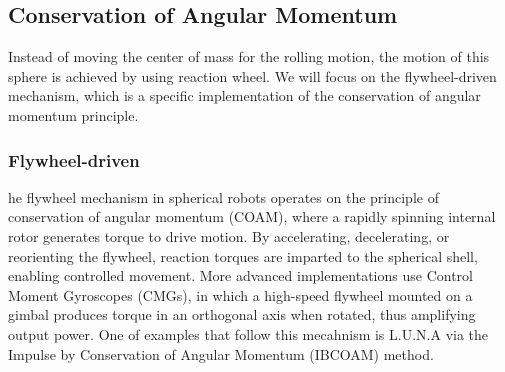 \documentclass[english, bachelor, utf8]{base/thesis_telematics}
\begin{document}
\subsection{Conservation of Angular Momentum}
Instead of moving the center of mass for the rolling motion, the motion of this sphere is achieved by using reaction wheel. 
We will focus on the flywheel-driven mechanism, which is a specific implementation of the conservation of angular momentum principle.\cite{Aminata}
\subsubsection{Flywheel-driven}
he flywheel mechanism in spherical robots operates on the principle of conservation of angular momentum (COAM), where a rapidly spinning internal rotor generates torque to drive motion. By accelerating, decelerating, or reorienting the flywheel, reaction torques are imparted to the spherical shell, enabling controlled movement.
More advanced implementations use Control Moment Gyroscopes (CMGs), in which a high-speed flywheel mounted on a gimbal produces torque in an orthogonal axis when rotated, thus amplifying output power.
One of examples that follow this mecahnism is L.U.N.A\cite{luna} via the Impulse by Conservation of Angular Momentum (IBCOAM) method.
\end{document}
